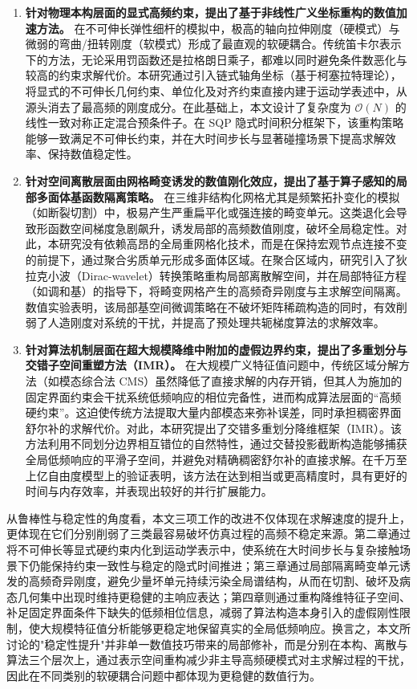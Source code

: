 \begin{enumerate}
    \item \textbf{针对物理本构层面的显式高频约束，提出了基于非线性广义坐标重构的数值加速方法。} 
    在不可伸长弹性细杆的模拟中，极高的轴向拉伸刚度（硬模式）与微弱的弯曲/扭转刚度（软模式）形成了最直观的软硬耦合。传统笛卡尔表示下的方法，无论采用罚函数还是拉格朗日乘子，都难以同时避免条件数恶化与较高的约束求解代价。本研究通过引入链式轴角坐标（基于柯塞拉特理论），将显式的不可伸长几何约束、单位化及对齐约束直接内建于运动学表述中，从源头消去了最高频的刚度成分。在此基础上，本文设计了复杂度为 $\mathcal{O}(N)$ 的线性一致对称正定混合预条件子。在 SQP 隐式时间积分框架下，该重构策略能够一致满足不可伸长约束，并在大时间步长与显著碰撞场景下提高求解效率、保持数值稳定性。

    \item \textbf{针对空间离散层面由网格畸变诱发的数值刚化效应，提出了基于算子感知的局部多面体基函数隔离策略。} 
    在三维非结构化网格尤其是频繁拓扑变化的模拟（如断裂切割）中，极易产生严重扁平化或强连接的畸变单元。这类退化会导致形函数空间梯度急剧飙升，诱发局部的高频数值刚度，破坏全局稳定性。对此，本研究没有依赖高昂的全局重网格化技术，而是在保持宏观节点连接不变的前提下，通过聚合劣质单元形成多面体区域。在聚合区域内，研究引入了狄拉克小波（Dirac-wavelet）转换策略重构局部离散解空间，并在局部特征方程（如调和基）的指导下，将畸变网格产生的高频奇异刚度与主求解空间隔离。数值实验表明，该局部基空间微调策略在不破坏矩阵稀疏构造的同时，有效削弱了人造刚度对系统的干扰，并提高了预处理共轭梯度算法的求解效率。

    \item \textbf{针对算法机制层面在超大规模降维中附加的虚假边界约束，提出了多重划分与交错子空间重塑方法（IMR）。} 
    在大规模广义特征值问题中，传统区域分解方法（如模态综合法 CMS）虽然降低了直接求解的内存开销，但其人为施加的固定界面约束会干扰系统低频响应的相位完备性，进而构成算法层面的“高频硬约束”。这迫使传统方法提取大量内部模态来弥补误差，同时承担稠密界面舒尔补的求解代价。对此，本研究提出了交错多重划分降维框架（IMR）。该方法利用不同划分边界相互错位的自然特性，通过交替投影截断构造能够捕获全局低频响应的平滑子空间，并避免对精确稠密舒尔补的直接求解。在千万至上亿自由度模型上的验证表明，该方法在达到相当或更高精度时，具有更好的时间与内存效率，并表现出较好的并行扩展能力。
\end{enumerate}

从鲁棒性与稳定性的角度看，本文三项工作的改进不仅体现在求解速度的提升上，更体现在它们分别削弱了三类最容易破坏仿真过程的高频不稳定来源。第二章通过将不可伸长等显式硬约束内化到运动学表示中，使系统在大时间步长与复杂接触场景下仍能保持约束一致性与稳定的隐式时间推进；第三章通过局部隔离畸变单元诱发的高频奇异刚度，避免少量坏单元持续污染全局谱结构，从而在切割、破坏及病态几何集中出现时维持更稳健的主响应表达；第四章则通过重构降维特征子空间、补足固定界面条件下缺失的低频相位信息，减弱了算法构造本身引入的虚假刚性限制，使大规模特征值分析能够更稳定地保留真实的全局低频响应。换言之，本文所讨论的"稳定性提升"并非单一数值技巧带来的局部修补，而是分别在本构、离散与算法三个层次上，通过表示空间重构减少非主导高频硬模式对主求解过程的干扰，因此在不同类别的软硬耦合问题中都体现为更稳健的数值行为。

